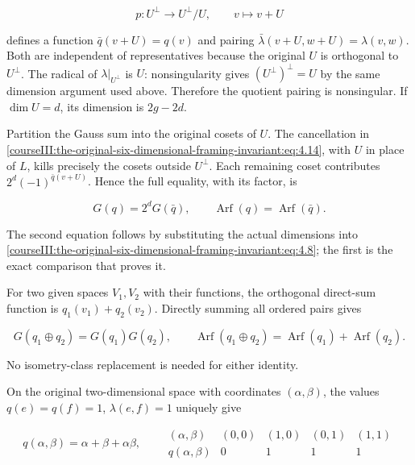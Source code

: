 \begin{equation}
p:U^\perp\longrightarrow U^\perp/U,\qquad v\longmapsto v+U
 \label{courseIII:the-original-six-dimensional-framing-invariant:eq:4.15}
\end{equation}

defines a function \(\bar q(v+U)=q(v)\) and pairing
\(\bar\lambda(v+U,w+U)=\lambda(v,w)\).
Both are independent of representatives because the original \(U\) is orthogonal to \(U^\perp\). The radical of \(\lambda|_{U^\perp}\) is \(U\): nonsingularity gives \((U^\perp)^\perp=U\) by the same dimension argument used above. Therefore the quotient pairing is nonsingular. If \(\dim U=d\), its dimension is \(2g-2d\).

Partition the Gauss sum into the original cosets of \(U\). The cancellation in \eqref{courseIII:the-original-six-dimensional-framing-invariant:eq:4.14}, with \(U\) in place of \(L\), kills precisely the cosets outside \(U^\perp\). Each remaining coset contributes \(2^d(-1)^{\bar q(v+U)}\). Hence the full equality, with its factor, is

\begin{equation}
G(q)=2^dG(\bar q),\qquad
 \operatorname{Arf}(q)=\operatorname{Arf}(\bar q).
 \label{courseIII:the-original-six-dimensional-framing-invariant:eq:4.16}
\end{equation}

The second equation follows by substituting the actual dimensions into \eqref{courseIII:the-original-six-dimensional-framing-invariant:eq:4.8}; the first is the exact comparison that proves it.

For two given spaces \(V_1,V_2\) with their functions, the orthogonal direct-sum function is \(q_1(v_1)+q_2(v_2)\). Directly summing all ordered pairs gives

\begin{equation}
G(q_1\oplus q_2)=G(q_1)G(q_2),\qquad
 \operatorname{Arf}(q_1\oplus q_2)
       =\operatorname{Arf}(q_1)+\operatorname{Arf}(q_2).
 \label{courseIII:the-original-six-dimensional-framing-invariant:eq:4.17}
\end{equation}

No isometry-class replacement is needed for either identity.

On the original two-dimensional space with coordinates \((\alpha,\beta)\), the values \(q(e)=q(f)=1\), \(\lambda(e,f)=1\) uniquely give

\begin{equation}
q(\alpha,\beta)=\alpha+\beta+\alpha\beta,\qquad
 \begin{array}{c|rrrr}
  (\alpha,\beta)&(0,0)&(1,0)&(0,1)&(1,1)\\ \hline
  q(\alpha,\beta)&0&1&1&1
 \end{array}
 \label{courseIII:the-original-six-dimensional-framing-invariant:eq:4.18}
\end{equation}

